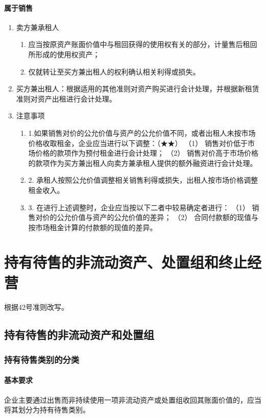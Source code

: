 \documentclass[UTF8,12pt]{ctexart}
\numberwithin{equation}{section} %
\numberwithin{figure}{section}
\numberwithin{table}{section}
\begin{document}
	\paragraph{属于销售}
	\begin{enumerate}
		\item 卖方兼承租人
		\begin{enumerate}
			\item 应当按原资产账面价值中与租回获得的使用权有关的部分，计量售后租回所形成的使用权资产；
			\item 仅就转让至买方兼出租人的权利确认相关利得或损失。
		\end{enumerate}
		
		\item 买方兼出租人：根据适用的其他准则对资产购买进行会计处理，并根据新租赁准则对资产出租进行会计处理。

		\item 注意事项
		\begin{enumerate}
			\item 1.如果销售对价的公允价值与资产的公允价值不同，或者出租人未按市场价格收取租金，企业应当进行以下调整：（★★）
			（1）	销售对价低于市场价格的款项作为预付租金进行会计处理；
			（2）	销售对价高于市场价格的款项作为买方兼出租人向卖方兼承租人提供的额外融资进行会计处理。
			\item 2.	承租人按照公允价值调整相关销售利得或损失，出租人按市场价格调整租金收入。
			\item 3.	在进行上述调整时，企业应当按以下二者中较易确定者进行：
			（1）	销售对价的公允价值与资产的公允价值的差异；
			（2）	合同付款额的现值与按市场租金计算的付款额的现值的差异。
		\end{enumerate}
	\end{enumerate}
	
	\newpage
	\section{持有待售的非流动资产、处置组和终止经营}
	根据42号准则改写。
	\subsection{持有待售的非流动资产和处置组}
	\subsubsection{持有待售类别的分类}
	\paragraph{基本要求}
	企业主要通过出售而非持续使用一项非流动资产或处置组收回其账面价值的，应当将其划分为持有待售类别。
	
\end{document}

